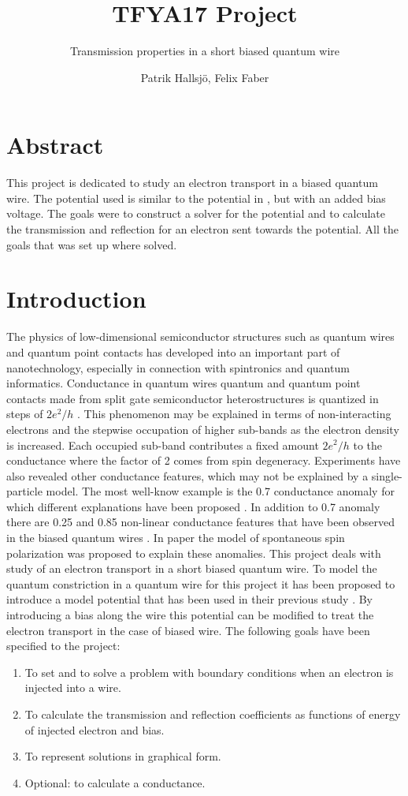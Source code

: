 \documentclass[a4paper]{article}
\subtitle{Transmission properties in a short biased quantum wire}
\title{TFYA17 Project}
\author{Patrik Hallsj\"o, Felix Faber}
\date{}
\begin{document}
\maketitle

\section*{Abstract}
This project is dedicated to study an electron transport in a biased quantum wire. The potential used is similar to the potential in \cite{5}, but with an added bias voltage. The goals were to construct a solver for the potential and to calculate the transmission and reflection for an electron sent towards the potential. All the goals that was set up where solved.

\newpage
\section{Introduction}
The physics of low-dimensional semiconductor structures such as quantum wires and quantum point contacts has developed into an important part of nanotechnology, especially in connection with spintronics and quantum informatics.
Conductance in quantum wires quantum and quantum point contacts  made from split gate semiconductor heterostructures is quantized in steps of $2e^2/h$ \cite{1}.
This phenomenon may be explained in terms of non-interacting electrons and the stepwise occupation of higher sub-bands as the electron density is increased.
Each occupied sub-band contributes a fixed amount $2e^2 /h$  to the conductance where the factor of 2 comes from spin degeneracy.
Experiments have also revealed other conductance features, which may not be explained by a single-particle model.
The most well-know example is the 0.7 conductance anomaly  for which different explanations have been proposed \cite{2}.  In addition to 0.7 anomaly there are  0.25 and 0.85 non-linear conductance features that have been observed in the biased quantum wires \cite{3}.
In paper \cite{4} the model of spontaneous spin polarization was proposed to explain these anomalies.
This project deals with study of an electron transport in a short biased quantum wire. To model the quantum constriction in a quantum wire for this project it has been proposed to introduce a model potential that has been used in their previous study \cite{5}.
By introducing a bias along the wire this potential can be modified to treat the electron transport in the case of biased wire.
The following goals have been specified to the project:
\begin{enumerate}
\item To set and to solve a problem with boundary conditions when an electron is injected into a wire.
\item To calculate the transmission and reflection coefficients as functions of energy of injected electron and bias.
\item To represent solutions in graphical form.
\item Optional: to calculate a conductance.
\end{enumerate}
\end{document}

